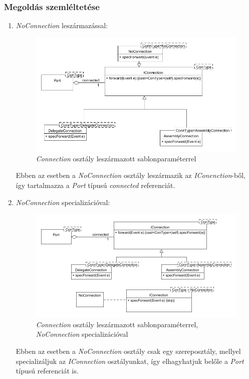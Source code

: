 \documentclass[a4paper,12pt]{report}
\begin{document}
\subsubsection{Megoldás szemléltetése}
\begin{enumerate}
\item \textit{NoConnection} leszármazással: \\

\begin{figure}[H]
\begin{center}
\includegraphics[scale=0.6]{extended_connection.png}
\end{center}
\caption{\textit{Connection} osztály leszármazott sablonparaméterrel}
\end{figure}

Ebben az esetben a \textit{NoConnection} osztály leszármazik az \textit{IConenction}-ből, így tartalmazza a \textit{Port} típusú \textit{connected} referenciát.
\item \textit{NoConnection} specializációval: \\

\begin{figure}[H]
\begin{center}
\includegraphics[scale=0.6]{extended_connection_spec.png}
\end{center}
\caption{\textit{Connection} osztály leszármazott sablonparaméterrel, \textit{NoConnection} specializációval}
\end{figure}

Ebben az esetben a \textit{NoConnection} osztály csak egy szereposztály, mellyel specializáljuk az \textit{IConnection} osztályunkat, így elhagyhatjuk belőle a \textit{Port} típusú referenciát is.
\end{enumerate}
\end{document}
